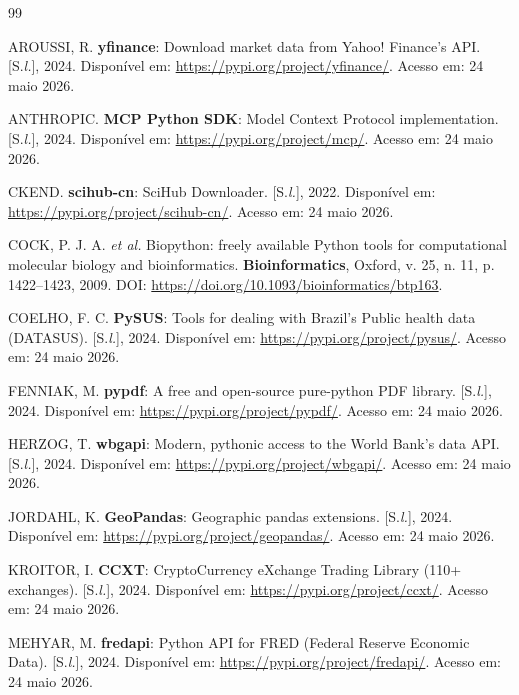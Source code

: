 \documentclass[12pt,a4paper]{article}
\begin{document}
\begin{thebibliography}{99}

AROUSSI, R. \textbf{yfinance}: Download market data from Yahoo! Finance's API. [S.\textit{l.}], 2024.
Disponível em: \url{https://pypi.org/project/yfinance/}. Acesso em: 24 maio 2026.

ANTHROPIC. \textbf{MCP Python SDK}: Model Context Protocol implementation. [S.\textit{l.}], 2024.
Disponível em: \url{https://pypi.org/project/mcp/}. Acesso em: 24 maio 2026.

CKEND. \textbf{scihub-cn}: SciHub Downloader. [S.\textit{l.}], 2022.
Disponível em: \url{https://pypi.org/project/scihub-cn/}. Acesso em: 24 maio 2026.

COCK, P. J. A. \textit{et al.} Biopython: freely available Python tools for computational
molecular biology and bioinformatics. \textbf{Bioinformatics}, Oxford, v. 25, n. 11,
p. 1422--1423, 2009. DOI: \url{https://doi.org/10.1093/bioinformatics/btp163}.

COELHO, F. C. \textbf{PySUS}: Tools for dealing with Brazil's Public health data (DATASUS).
[S.\textit{l.}], 2024. Disponível em: \url{https://pypi.org/project/pysus/}.
Acesso em: 24 maio 2026.

FENNIAK, M. \textbf{pypdf}: A free and open-source pure-python PDF library. [S.\textit{l.}], 2024.
Disponível em: \url{https://pypi.org/project/pypdf/}. Acesso em: 24 maio 2026.

HERZOG, T. \textbf{wbgapi}: Modern, pythonic access to the World Bank's data API. [S.\textit{l.}], 2024.
Disponível em: \url{https://pypi.org/project/wbgapi/}. Acesso em: 24 maio 2026.

JORDAHL, K. \textbf{GeoPandas}: Geographic pandas extensions. [S.\textit{l.}], 2024.
Disponível em: \url{https://pypi.org/project/geopandas/}. Acesso em: 24 maio 2026.

KROITOR, I. \textbf{CCXT}: CryptoCurrency eXchange Trading Library (110+ exchanges).
[S.\textit{l.}], 2024. Disponível em: \url{https://pypi.org/project/ccxt/}.
Acesso em: 24 maio 2026.

MEHYAR, M. \textbf{fredapi}: Python API for FRED (Federal Reserve Economic Data).
[S.\textit{l.}], 2024. Disponível em: \url{https://pypi.org/project/fredapi/}.
Acesso em: 24 maio 2026.


\end{thebibliography}
\end{document}
